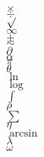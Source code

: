 \documentclass{article}
\begin{document}
                   $\times$ \\
                     $\div$ \\
                      $\surd$ \\
                       $\infty$ \\
                        $\pm$ \\
                         $\sim$ \\
                          $\partial$ \\
                           $\alpha$ \\
                            $\pi$ \\
                             $\theta$ \\
                              $\ln$ \\
                               $\log$ \\
                                $\int$ \\
                                 $\rho$ \\
                                  $\sum$ \\
                                   $\eta$ \\
                                    $\arcsin$ \\
                                     $\lambda$ \\
                                      $\omega$ \\
        
\end{document}
